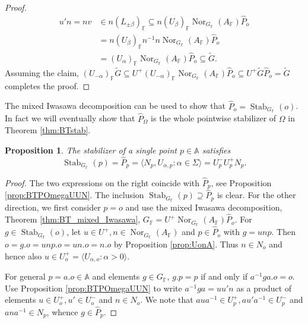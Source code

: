 \documentclass[12pt]{amsart}
\newcommand{\F}{\mathbb{F} }
\newcommand{\A}{\mathbb{A}}
\numberwithin{equation}{section}
\newtheorem{proposition}[theorem]{Proposition}
\theoremstyle{remark} %
\begin{document}
\begin{proof}
			\begin{align*}
				u'n = nv &\in n(L_{\pm \beta})_\F \subseteq n(U_{\beta})_\F \operatorname{Nor}_{G_\F}(A_\F) \hat{P}_o \\
				&= n (U_{\beta})_\F n^{-1} n \operatorname{Nor}_{G_\F}(A_\F) \hat{P}_o  \\
				&= (U_\alpha)_\F \operatorname{Nor}_{G_\F}(A_\F) \hat{P}_o \subseteq \tilde{G}.
			\end{align*}
			Assuming the claim, $(U_{-\alpha})_\F \tilde{G} \subseteq U^+ (U_{-\alpha})_\F \operatorname{Nor}_{G_\F}(A_\F) \hat{P}_o \subseteq U^+ \tilde{G} \hat{P}_o = \tilde{G}$ completes the proof. 
		\end{proof}
		
		The mixed Iwasawa decomposition can be used to show that $\hat{P}_o = \operatorname{Stab}_{G_\F}(o)$. In fact we will eventually show that $\hat{P}_\Omega$ is the whole pointwise stabilizer of $\Omega$ in Theorem \ref{thm:BTstab}.
		\begin{proposition}\label{prop:BTstab_point}
			The stabilizer of a single point $p \in \A$ satisfies
			$$
			\operatorname{Stab}_{G_\F}(p) = \hat{P}_p = \langle N_{p} , U_{\alpha, p} \colon \alpha \in \Sigma \rangle = U_p^- U_{p}^+ N_p.
			$$
		\end{proposition}
		\begin{proof} The two expressions on the right coincide with $\hat{P}_p$, see Proposition \ref{prop:BTPOmegaUUN}.	The inclusion $\operatorname{Stab}_{G_\F}(p)  \supseteq \hat{P}_p$ is clear. For the other direction, we first consider $p=o$ and use the mixed Iwasawa decomposition, Theorem \ref{thm:BT_mixed_Iwasawa}, $G_\F = U^+ \operatorname{Nor}_{G_\F}(A_\F) \hat{P}_o$. For $g \in \operatorname{Stab}_{G_\F}(o)$, let $u \in U^+, n \in \operatorname{Nor}_{G_\F}(A_\F)$ and $p \in \hat{P}_o$ with $g=unp$. Then $o = g.o = unp.o = un.o = n.o$ by Proposition \ref{prop:UonA}. Thus $n \in N_o$ and hence also $u \in U_o^+ = \langle U_{\alpha,o} \colon \alpha>0 \rangle$.
			
			For general $p=a.o\in \A$ and elements $g\in G_\F$, $g.p=p$ if and only if $a^{-1}ga.o=o$. Use Proposition \ref{prop:BTPOmegaUUN} to write $a^{-1}ga = uu'n$ as a product of elements $u\in U^+_o, u' \in U_o^-$ and $n \in N_o$. We note that $aua^{-1} \in U_p^+, au'a^{-1} \in U_p^-$ and $ana^{-1} \in N_p$, whence $g \in \hat{P}_p$.
		\end{proof}
		
\end{document}
